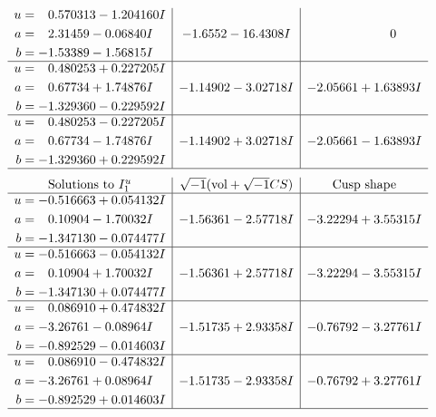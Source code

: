 \documentclass[1p]{elsarticle_modified}
\theoremstyle{definition}
\newcommand{\I}{\sqrt{-1}}
\begin{document}
$$\begin{array}{c|c|c}
\begin{aligned}
u &= \phantom{-}0.570313 - 1.204160 I \\
a &= \phantom{-}2.31459 - 0.06840 I \\
b &= -1.53389 - 1.56815 I\end{aligned}
 & -1.6552 - 16.4308 I & \phantom{-0.000000 } 0 \\ \hline\begin{aligned}
u &= \phantom{-}0.480253 + 0.227205 I \\
a &= \phantom{-}0.67734 + 1.74876 I \\
b &= -1.329360 - 0.229592 I\end{aligned}
 & -1.14902 - 3.02718 I & -2.05661 + 1.63893 I \\ \hline\begin{aligned}
u &= \phantom{-}0.480253 - 0.227205 I \\
a &= \phantom{-}0.67734 - 1.74876 I \\
b &= -1.329360 + 0.229592 I\end{aligned}
 & -1.14902 + 3.02718 I & -2.05661 - 1.63893 I\\
 \hline 
 \end{array}$$\newpage$$\begin{array}{c|c|c}  
\text{Solutions to }I^u_{1}& \I (\text{vol} + \sqrt{-1}CS) & \text{Cusp shape}\\
 \hline 
\begin{aligned}
u &= -0.516663 + 0.054132 I \\
a &= \phantom{-}0.10904 - 1.70032 I \\
b &= -1.347130 - 0.074477 I\end{aligned}
 & -1.56361 - 2.57718 I & -3.22294 + 3.55315 I \\ \hline\begin{aligned}
u &= -0.516663 - 0.054132 I \\
a &= \phantom{-}0.10904 + 1.70032 I \\
b &= -1.347130 + 0.074477 I\end{aligned}
 & -1.56361 + 2.57718 I & -3.22294 - 3.55315 I \\ \hline\begin{aligned}
u &= \phantom{-}0.086910 + 0.474832 I \\
a &= -3.26761 - 0.08964 I \\
b &= -0.892529 - 0.014603 I\end{aligned}
 & -1.51735 + 2.93358 I & -0.76792 - 3.27761 I \\ \hline\begin{aligned}
u &= \phantom{-}0.086910 - 0.474832 I \\
a &= -3.26761 + 0.08964 I \\
b &= -0.892529 + 0.014603 I\end{aligned}
 & -1.51735 - 2.93358 I & -0.76792 + 3.27761 I\\
 \hline 
 \end{array}$$\newpage\newpage\renewcommand{\arraystretch}{1}
\end{document}
